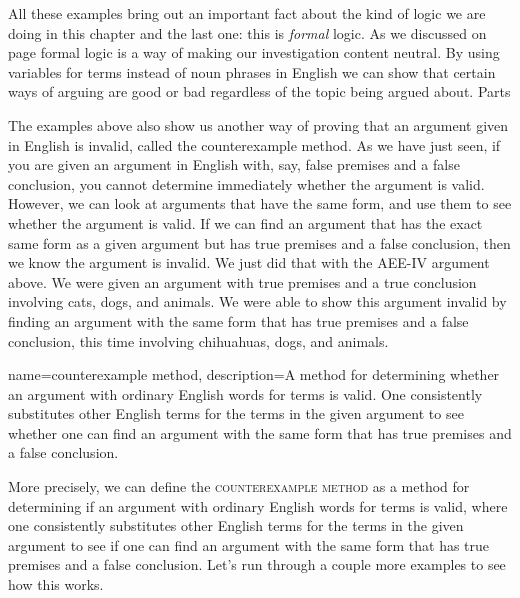 All these examples bring out an important fact about the kind of logic we are doing in this chapter and the last one: this is \emph{formal} logic. As we discussed on page \pageref{def:Formal_logic} formal logic is a way of making our investigation content neutral. By using variables for terms instead of noun phrases in English we can show that certain ways of arguing are good or bad regardless of the topic being argued about.  
{Parts  
{}}


The examples above also show us another way of proving that an argument given in English is invalid, called the counterexample method. As we have just seen, if you are given an argument in English with, say, false premises and a false conclusion, you cannot determine immediately whether the argument is valid. However, we can look at arguments that have the same form, and use them to see whether the argument is valid. If we can find an argument that has the exact same form as a given argument but has true premises and a false conclusion, then we know the argument is invalid. We just did that with the AEE-IV argument above. We were given an argument with true premises and a true conclusion involving cats, dogs, and animals. We were able to show this argument invalid by finding an argument with the same form that has true premises and a false conclusion, this time involving chihuahuas, dogs, and animals. 


{
name=counterexample method,
description={A method for determining whether an argument with ordinary English words for terms is valid. One consistently substitutes other English terms for the terms in the given argument to see whether one can find an argument with the same form that has true premises and a false conclusion.}
}

More precisely, we can define the \textsc{\gls{counterexample method}} \label{def:counter_example_method} as a method for determining if an argument with ordinary English words for terms is valid, where one consistently substitutes other English terms for the terms in the given argument to see if one can find an argument with the same form that has true premises and a false conclusion. Let's run through a couple more examples to see how this works. 

